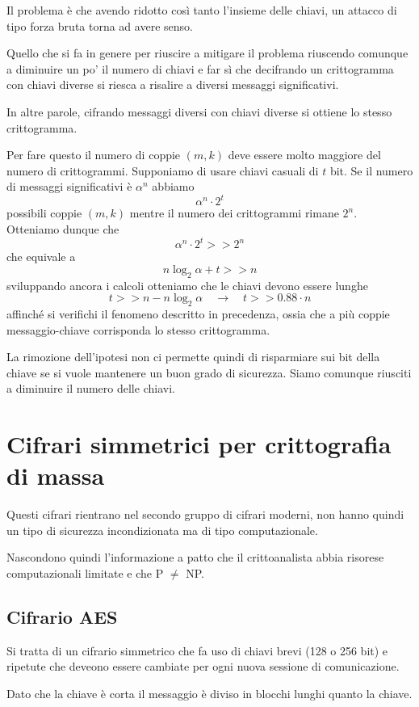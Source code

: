 Il problema \`e che avendo ridotto cos\`i tanto l'insieme delle chiavi, un attacco di tipo forza bruta torna ad avere
senso.

Quello che si fa in genere per riuscire a mitigare il problema riuscendo comunque a diminuire un po' il numero di chiavi
e far s\`i che decifrando un crittogramma con chiavi diverse si riesca a risalire a diversi messaggi significativi.

In altre parole, cifrando messaggi diversi con chiavi diverse si ottiene lo stesso crittogramma.

Per fare questo il numero di coppie $(m, k)$ deve essere molto maggiore del numero di crittogrammi. Supponiamo di usare
chiavi casuali di $t$ bit. Se il numero di messaggi significativi \`e $\alpha^n$ abbiamo
\[ \alpha^n \cdot 2^t \]
possibili coppie $(m, k)$ mentre il numero dei crittogrammi rimane $2^n$. Otteniamo dunque che
\[ \alpha^n \cdot 2^t >> 2^n \]
che equivale a
\[ n \log_2 \alpha + t >> n \]
sviluppando ancora i calcoli otteniamo che le chiavi devono essere lunghe
\[ t >> n - n\log_2 \alpha \quad \rightarrow \quad t >> 0.88 \cdot n \]
affinch\'e si verifichi il fenomeno descritto in precedenza, ossia che a pi\`u coppie messaggio-chiave corrisponda lo
stesso crittogramma.

La rimozione dell'ipotesi non ci permette quindi di risparmiare sui bit della chiave se si vuole mantenere un buon grado
di sicurezza. Siamo comunque riusciti a diminuire il numero delle chiavi.

\section{Cifrari simmetrici per crittografia di massa}
Questi cifrari rientrano nel secondo gruppo di cifrari moderni, non hanno quindi un tipo di sicurezza incondizionata ma
di tipo computazionale.

Nascondono quindi l'informazione a patto che il crittoanalista abbia risorese computazionali limitate e che P $\neq$ NP.

\subsection{Cifrario AES}
Si tratta di un cifrario simmetrico che fa uso di chiavi brevi (128 o 256 bit) e ripetute che deveono essere cambiate
per ogni nuova sessione di comunicazione.

Dato che la chiave \`e corta il messaggio \`e diviso in blocchi lunghi quanto la chiave.

